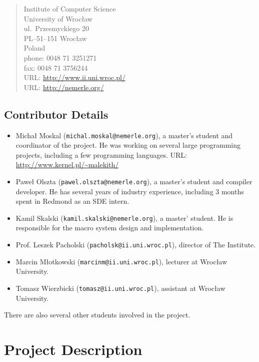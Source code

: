 \documentclass[a4paper,11pt]{article}
\begin{document}
\begin{quote}
Institute of Computer Science\\
University of Wroc\l aw\\
ul.\ Przesmyckiego 20\\
PL--51--151 Wroc\l aw\\
Poland\\[2ex]
phone: 0048 71 3251271\\
fax:   0048 71 3756244\\
URL: \url{http://www.ii.uni.wroc.pl/}\\
URL: \url{http://nemerle.org/}
\end{quote}


\subsection{Contributor Details}
\begin{itemize}

\item
Micha{\l} Moskal (\texttt{michal.moskal@nemerle.org}), a master's
student and coordinator of the project. He was working on several large
programming projects, including a few programming languages. URL: 
\url{http://www.kernel.pl/~malekith/}

\item
Pawe{\l} Olszta (\texttt{pawel.olszta@nemerle.org}), a master's student
and compiler developer. He has several years of industry experience, 
including 3 months spent in Redmond as an SDE intern. 

\item
Kamil Skalski (\texttt{kamil.skalski@nemerle.org}), a master' student.
He is responsible for the macro system design and implementation.

\item
Prof. Leszek Pacholski (\texttt{pacholsk@ii.uni.wroc.pl}), director of The Institute.

\item
Marcin M\l otkowski (\texttt{marcinm@ii.uni.wroc.pl}), lecturer at Wroc\l aw University.

\item
Tomasz Wierzbicki (\texttt{tomasz@ii.uni.wroc.pl}), assistant at Wroc\l aw University.

\end{itemize}

There are also several other students involved in the project.


\section{Project Description}
\end{document}
